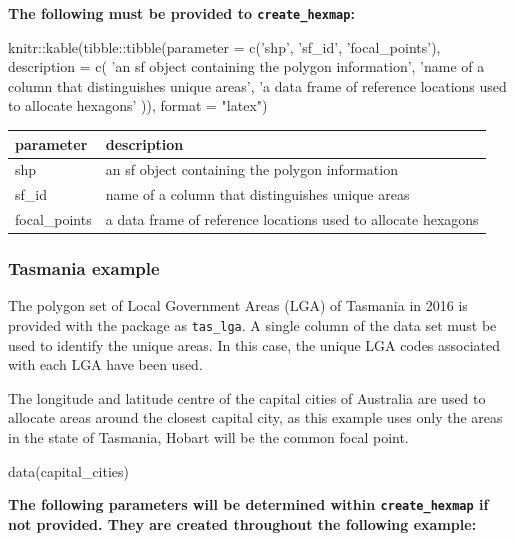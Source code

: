 \textbf{The following must be provided to \texttt{create\_hexmap}:}

\begin{Schunk}
\begin{Sinput}
knitr::kable(tibble::tibble(parameter = c('shp', 
  'sf_id',
  'focal_points'),
  description = c(
    'an sf object containing the polygon information', 
    'name of a column that distinguishes unique areas',
    'a data frame of reference locations used to allocate hexagons'
    )), format = "latex")
\end{Sinput}

\begin{tabular}{l|l}
\hline
parameter & description\\
\hline
shp & an sf object containing the polygon information\\
\hline
sf\_id & name of a column that distinguishes unique areas\\
\hline
focal\_points & a data frame of reference locations used to allocate hexagons\\
\hline
\end{tabular}

\end{Schunk}

\hypertarget{tasmania-example}{%
\subsubsection{Tasmania example}\label{tasmania-example}}

The polygon set of Local Government Areas (LGA) of Tasmania in 2016 is
provided with the  package as \texttt{tas\_lga}. A
single column of the data set must be used to identify the unique areas.
In this case, the unique LGA codes associated with each LGA have been
used.

The longitude and latitude centre of the capital cities of Australia are
used to allocate areas around the closest capital city, as this example
uses only the areas in the state of Tasmania, Hobart will be the common
focal point.

\begin{Schunk}
\begin{Sinput}
data(capital_cities)
\end{Sinput}
\end{Schunk}

\textbf{The following parameters will be determined within
\texttt{create\_hexmap} if not provided. They are created throughout the
following example:}

